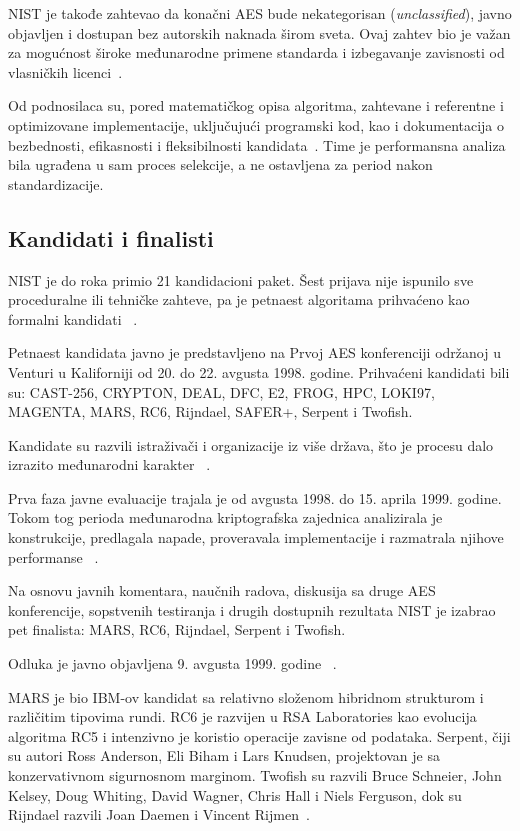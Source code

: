 NIST je takođe zahtevao da konačni AES bude nekategorisan
(\emph{unclassified}), javno objavljen i dostupan bez autorskih
naknada širom sveta. Ovaj zahtev bio je važan za mogućnost široke
međunarodne primene standarda i izbegavanje zavisnosti od vlasničkih
licenci~\cite{nist-aes-call-1997}.

Od podnosilaca su, pored matematičkog opisa algoritma, zahtevane i
referentne i optimizovane implementacije, uključujući programski kod,
kao i dokumentacija o bezbednosti, efikasnosti i fleksibilnosti
kandidata~\cite{nist-aes-history}. Time je performansna analiza bila
ugrađena u sam proces selekcije, a ne ostavljena za period nakon
standardizacije.


\subsection{Kandidati i finalisti}
\label{subsec:aes_kandidati}

NIST je do roka primio 21 kandidacioni paket. Šest prijava nije
ispunilo sve proceduralne ili tehničke zahteve, pa je petnaest
algoritama prihvaćeno kao formalni kandidati
~\cite{nist-aes-development-2021}.

Petnaest kandidata javno je predstavljeno na Prvoj AES konferenciji
održanoj u Venturi u Kaliforniji od 20. do 22. avgusta 1998. godine.
Prihvaćeni kandidati bili su:
CAST-256, CRYPTON, DEAL, DFC, E2, FROG, HPC, LOKI97, MAGENTA, MARS, RC6, Rijndael, SAFER+, Serpent i Twofish.

Kandidate su razvili istraživači i organizacije iz više država, što je
procesu dalo izrazito međunarodni karakter
~\cite{nist-aes-candidates-1998}.

Prva faza javne evaluacije trajala je od avgusta 1998. do
15. aprila 1999. godine. Tokom tog perioda međunarodna kriptografska
zajednica analizirala je konstrukcije, predlagala napade, proveravala
implementacije i razmatrala njihove performanse
~\cite{nist-aes-first-round-1999}.

Na osnovu javnih komentara, naučnih radova, diskusija sa druge AES
konferencije, sopstvenih testiranja i drugih dostupnih rezultata NIST
je izabrao pet finalista:
MARS, RC6, Rijndael, Serpent i Twofish.

Odluka je javno objavljena 9. avgusta 1999. godine
~\cite{nist-aes-finalists-1999}.

MARS je bio IBM-ov kandidat sa relativno složenom hibridnom strukturom
i različitim tipovima rundi. RC6 je razvijen u RSA Laboratories kao
evolucija algoritma RC5 i intenzivno je koristio operacije zavisne od
podataka. Serpent, čiji su autori Ross Anderson, Eli Biham i Lars
Knudsen, projektovan je sa konzervativnom sigurnosnom marginom.
Twofish su razvili Bruce Schneier, John Kelsey, Doug Whiting, David
Wagner, Chris Hall i Niels Ferguson, dok su Rijndael razvili Joan
Daemen i Vincent Rijmen~\cite{nist-aes-finalists-1999}.

